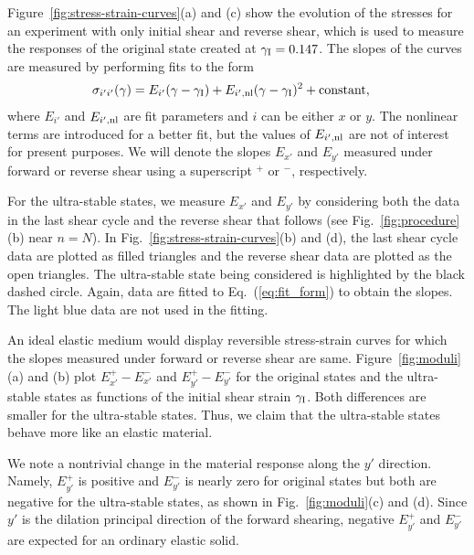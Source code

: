 \documentclass[twocolumn,showkeys,superscriptaddress,preprintnumbers,amsmath,amssymb,showpacs,prx,longbibliography]{revtex4-2}
\begin{document}
\begin{CJK*}{UTF8}{gbsn}
Figure~\ref{fig:stress-strain-curves}(a) and (c) show the evolution of the stresses for an experiment with only initial shear and reverse shear, which is used to measure the responses of the original state created at $\gamma_{\rm I} = 0.147$. The slopes of the curves are measured by performing fits to 
the form
\begin{equation}\label{eq:fit_form}
\begin{split}
\sigma_{i'i'}(\gamma) & =E_{i'}(\gamma-\gamma_{\rm I})+E_{i',\rm nl}(\gamma-\gamma_{\rm I})^2+{\rm constant},
\end{split}
\end{equation}
where $E_{i'}$ and $E_{i',\rm nl}$ are fit parameters and $i$ can be either $x$ or $y$. The nonlinear terms are introduced for a better fit, but the values of $E_{i',\rm nl}$ are not of  interest for present purposes. We will denote the slopes $E_{x'}$ and $E_{y'}$ measured under forward or reverse shear using a superscript $^+$ or $^-$, respectively.


For the ultra-stable states, we measure
$E_{x'}$ and $E_{y'}$ by considering both the data in the last shear cycle and the reverse shear that follows (see Fig.~\ref{fig:procedure}(b) near $n=N$). In Fig.~\ref{fig:stress-strain-curves}(b) and (d), the last shear cycle data are plotted as filled triangles and the reverse shear data are plotted as the open triangles. The ultra-stable state being considered is highlighted by the black dashed circle. Again, 
data are fitted to Eq.~(\ref{eq:fit_form}) to obtain the slopes. The light blue data are not used in the fitting.

An ideal elastic medium 
would
display reversible stress-strain curves for which the slopes measured under forward or reverse shear are same. Figure~\ref{fig:moduli}(a) and (b) plot $E_{x'}^+-E_{x'}^-$ and $E_{y'}^+-E_{y'}^-$ for the original states and the ultra-stable states as functions of the initial shear strain $\gamma_{\rm I}$. Both differences are smaller for the ultra-stable states. Thus, we claim that the ultra-stable states behave more like an elastic material.

We note a nontrivial change in the material response along the $y'$ direction. Namely, $E_{y'}^+$ is positive and $E_{y'}^-$ is nearly zero for original states but both are negative for the ultra-stable states, as shown in Fig.~\ref{fig:moduli}(c) and (d).  Since $y'$ is the dilation principal direction of the forward shearing, negative $E_{y'}^+$ and $E_{y'}^-$ are expected for an ordinary elastic solid.



\end{CJK*}
\end{document}
